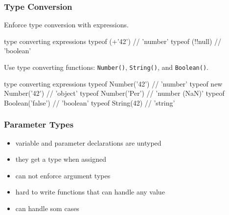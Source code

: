 \begin{frame}[fragile]
  \frametitle{Type Conversion}
  Enforce type conversion with expressions.\\
  \begin{CodeBox}{ type converting expressions}
typeof (+'42') // 'number'
typeof (!!null) // 'boolean'
  \end{CodeBox}
  \vspace{5mm}
  Use type converting functions: \verb|Number()|, \verb|String()|, and \verb|Boolean()|.
  \begin{CodeBox}{ type converting expressions}
typeof Number('42') // 'number'
typeof new Number('42') // 'object'
typeof Number('Per') // 'number (NaN)'
typeof Boolean('false') // 'boolean'
typeof String(42) // 'string'
  \end{CodeBox}
\end{frame}

\begin{frame}[fragile]
  \frametitle{Parameter Types}
  \begin{itemize}
  \item variable and parameter declarations are untyped\\
  \item they get a type when assigned
  \item can not enforce argument types
  \item hard to write functions that can handle any value
  \item {} can handle som cases
  \end{itemize}
\end{frame}

